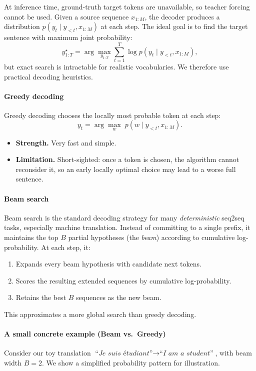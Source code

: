 \noindent
At inference time, ground-truth target tokens are unavailable,
so teacher forcing cannot be used.
Given a source sequence \(x_{1:M}\),
the decoder produces a distribution
\(
p(y_t \mid y_{<t}, x_{1:M})
\)
at each step.
The ideal goal is to find the target sentence with maximum joint probability:
\[
y_{1:T}^\star
=
\arg\max_{y_{1:T}}
\sum_{t=1}^{T}
\log p(y_t \mid y_{<t}, x_{1:M}),
\]
but exact search is intractable for realistic vocabularies.
We therefore use practical decoding heuristics.

\paragraph{Greedy decoding}
\noindent
Greedy decoding chooses the locally most probable token at each step:
\[
y_t = \arg\max_{w} \; p(w \mid y_{<t}, x_{1:M}).
\]
\begin{itemize}
	\item \textbf{Strength.}
	Very fast and simple.
	\item \textbf{Limitation.}
	Short-sighted:
	once a token is chosen, the algorithm cannot reconsider it,
	so an early locally optimal choice may lead to a worse full sentence.
\end{itemize}

\paragraph{Beam search}
\noindent
Beam search is the standard decoding strategy for many \emph{deterministic} seq2seq tasks,
especially machine translation.
Instead of committing to a single prefix,
it maintains the top \(B\) partial hypotheses (the \emph{beam})
according to cumulative log-probability.
At each step, it:
\begin{enumerate}
	\item Expands every beam hypothesis with candidate next tokens.
	\item Scores the resulting extended sequences by cumulative log-probability.
	\item Retains the best \(B\) sequences as the new beam.
\end{enumerate}
This approximates a more global search than greedy decoding.

\paragraph{A small concrete example (Beam vs.\ Greedy)}
\noindent
Consider our toy translation
\(
\textit{``Je suis \'{e}tudiant''}
\rightarrow
\textit{``I am a student''}
\),
with beam width \(B=2\).
We show a simplified probability pattern for illustration.

